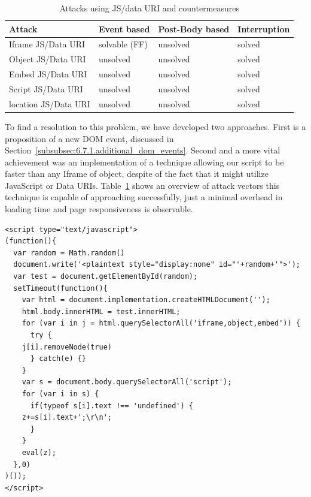 \begin{table}
  \centering
    \begin{tabular}{| l | l | l | l |}
    \hline
    Attack & Event based & Post-Body based & Interruption  \\ \hline
    Iframe JS/Data URI & solvable (FF) & unsolved & solved  \\ \hline
    Object JS/Data URI & unsolved & unsolved & solved  \\ \hline
    Embed  JS/Data URI & unsolved & unsolved & solved  \\ \hline
    Script JS/Data URI & unsolved & unsolved & solved  \\ \hline
    location JS/Data URI & unsolved & unsolved & solved  \\ \hline
    \end{tabular}
    \label{tbl:attacks-using-js-uris}
    \caption{Attacks using JS/data URI and countermeasures}
\end{table}

    To find a resolution to this problem, we have developed two approaches. First is a proposition of a new DOM event, discussed in Section~\ref{subsubsec:6.7.1.additional_dom_events}. Second and a more vital achievement was an implementation of a technique allowing our script to be faster than any Iframe of object, despite of the fact that it might utilize JavaScript or Data URIs. Table~\ref{tbl:attacks-using-js-uris} shows an overview of attack vectors this technique is capable of approaching successfully, just a minimal overhead in loading time and page responsiveness is observable. 


\begin{lstlisting}[captionpos=b,label=lst:document-implementation,caption=Working DOM proxy example code using the plaintext interruption technique]
<script type="text/javascript">
(function(){
  var random = Math.random()
  document.write('<plaintext style="display:none" id="'+random+'">');
  var test = document.getElementById(random);
  setTimeout(function(){
    var html = document.implementation.createHTMLDocument('');
    html.body.innerHTML = test.innerHTML;
    for (var i in j = html.querySelectorAll('iframe,object,embed')) {
      try {
	j[i].removeNode(true)
      } catch(e) {}
    }
    var s = document.body.querySelectorAll('script');
    for (var i in s) {
      if(typeof s[i].text !== 'undefined') {
	z+=s[i].text+';\r\n';
      }
    }
    eval(z);
  },0)
)());
</script>
\end{lstlisting}

